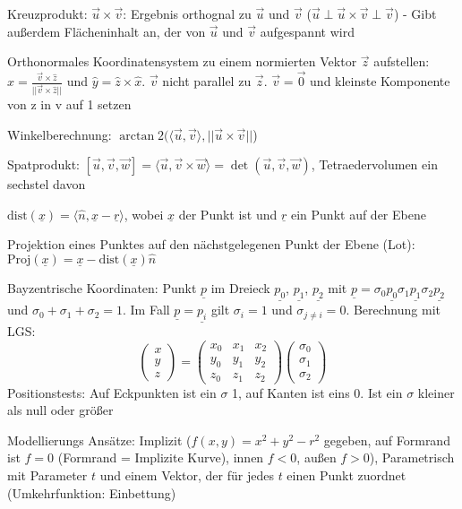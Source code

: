 \documentclass[12pt,landscape]{article}
\begin{document}
\begin{multicols}{3}
\begin{compactitem}
\item Kreuzprodukt: $\vec{u} \times \vec{v}$: Ergebnis orthognal zu $\vec{u}$ und $\vec{v}$ ($\vec{u} \perp \vec{u} \times \vec{v} \perp \vec{v}$) - Gibt außerdem Flächeninhalt an, der von $\vec{u}$ und $\vec{v}$ aufgespannt wird
\item Orthonormales Koordinatensystem zu einem normierten Vektor $\vec{z}$ aufstellen: $\hat{x} = \frac{\vec{v}\times \hat{z}}{||\vec{v} \times \hat{z}||}$ und $\hat{y} = \hat{z} \times \hat{x}$. $\vec{v}$ nicht parallel zu $\vec{z}$. $\vec{v} = \vec{0}$ und kleinste Komponente von z in v auf 1 setzen
\item Winkelberechnung: $\arctan2(\langle \vec{u}, \vec{v} \rangle, ||\vec{u} \times \vec{v}||$)
\item Spatprodukt: $[\vec{u}, \vec{v}, \vec{w}] = \langle \vec{u}, \vec{v} \times \vec{w} \rangle = \det(\vec{u}, \vec{v}, \vec{w})$, Tetraedervolumen ein sechstel davon
\item $\text{dist}(\underline{x}) = \langle \hat{n}, \underline{x} - \underline{r} \rangle$, wobei $\underline{x}$ der Punkt ist und $\underline{r}$ ein Punkt auf der Ebene
\item Projektion eines Punktes auf den nächstgelegenen Punkt der Ebene (Lot): $\text{Proj}(\underline{x}) = \underline{x} - \text{dist}(\underline{x})\hat{n}$ 
\item Bayzentrische Koordinaten: Punkt $\underline{p}$ im Dreieck $\underline{p_0}$, $\underline{p_1}$, $\underline{p_2}$ mit $\underline{p} = \sigma_0 \underline{p_0} \sigma_1 \underline{p_1} \sigma_2 \underline{p_2}$ und $\sigma_0 + \sigma_1 + \sigma_2 = 1$. Im Fall $\underline{p} = \underline{p_i}$ gilt $\sigma_i = 1$ und $\sigma_{j \neq i} = 0$. Berechnung mit LGS:
\[
\begin{pmatrix}x \\ y \\ z\end{pmatrix}
=
\begin{pmatrix}
x_0 & x_1 & x_2 \\
y_0 & y_1 & y_2 \\
z_0 & z_1 & z_2
\end{pmatrix}\begin{pmatrix}
\sigma_0 \\ \sigma_1 \\ \sigma_2
\end{pmatrix}
\] Positionstests: Auf Eckpunkten ist ein $\sigma$ 1, auf Kanten ist eins 0. Ist ein $\sigma$ kleiner als null oder größer
\item Modellierungs Ansätze: Implizit ($f(x,y) = x^2 + y^2 - r^2$ gegeben, auf Formrand ist $f = 0$ (Formrand = Implizite Kurve), innen $f < 0$, außen $f > 0$), Parametrisch mit Parameter $t$ und einem Vektor, der für jedes $t$ einen Punkt zuordnet (Umkehrfunktion: Einbettung)

\end{compactitem}
\end{multicols}
\end{document}
